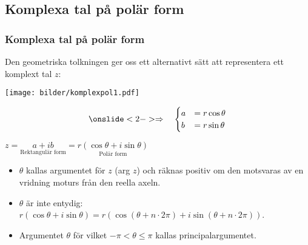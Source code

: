 \documentclass[slidestop,blue,handout,9pt]{beamer}
\begin{document}
\subsection{Komplexa tal på polär form}
\begin{frame}
\frametitle{Komplexa tal på polär form}
Den geometriska tolkningen ger oss ett alternativt sätt att representera
ett komplext tal $z$:
\begin{center}
\begin{minipage}{0.4\textwidth}
\texttt{[image: bilder/komplexpol1.pdf]}
\end{minipage}
\begin{minipage}{0.4\textwidth}
\begin{eqnarray*}
\onslide<2->
\Rightarrow \quad
\begin{cases}
a &= r\cos \theta \\ 
b &= r\sin \theta
\end{cases}
\end{eqnarray*}
\end{minipage}
\end{center}
\begin{center}
\begin{minipage}{0.44\linewidth}
\begin{block}{}
$z = \underset{\text{Rektangulär form}}{a + i b} 
= \underset{\text{Polär form}}{r(\cos \theta + i\sin \theta)}$
\end{block}  
\end{minipage}
\end{center}
\begin{itemize}
\item $\theta$ kallas \alert{argumentet för $z$} (arg $z$) och räknas positiv om den motsvaras av en vridning moturs från den reella axeln. 
\item $\theta$ är inte entydig: 
$r(\cos \theta + i \sin \theta) = r(\cos (\theta + n\cdot 2\pi) + i
\sin (\theta + n\cdot 2\pi))$.
\item Argumentet $\theta$ för vilket $-\pi < \theta \leq \pi $ kallas
  \alert{principalargumentet}.
\end{itemize}
\end{frame}
\end{document}
